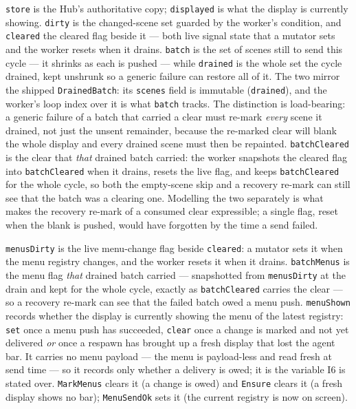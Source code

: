 \documentclass[a4paper,10pt,fleqn]{article}
\begin{document}
\texttt{store} is the Hub's authoritative copy; \texttt{displayed} is what
the display is currently showing.  \texttt{dirty} is the changed-scene set
guarded by the worker's condition, and \texttt{cleared} the cleared flag
beside it --- both live signal state that a mutator sets and the worker
resets when it drains.  \texttt{batch} is the set of scenes still to send this cycle --- it shrinks
as each is pushed --- while \texttt{drained} is the whole set the cycle
drained, kept unshrunk so a generic failure can restore all of it.  The two
mirror the shipped \texttt{DrainedBatch}: its \texttt{scenes} field is
immutable (\texttt{drained}), and the worker's loop index over it is what
\texttt{batch} tracks.  The distinction is load-bearing: a generic failure of
a batch that carried a clear must re-mark \emph{every} scene it drained, not
just the unsent remainder, because the re-marked clear will blank the whole
display and every drained scene must then be repainted.  \texttt{batchCleared}
is the clear that \emph{that} drained batch carried: the worker snapshots the
cleared flag into \texttt{batchCleared} when it drains, resets the live flag,
and keeps \texttt{batchCleared} for the whole cycle, so both the empty-scene
skip and a recovery re-mark can still see that the batch was a clearing one.
Modelling the two separately is what makes the recovery re-mark of a
consumed clear expressible; a single flag, reset when the blank is pushed,
would have forgotten by the time a send failed.

\texttt{menusDirty} is the live menu-change flag beside \texttt{cleared}: a
mutator sets it when the menu registry changes, and the worker resets it when
it drains.  \texttt{batchMenus} is the menu flag \emph{that} drained batch
carried --- snapshotted from \texttt{menusDirty} at the drain and kept for the
whole cycle, exactly as \texttt{batchCleared} carries the clear --- so a
recovery re-mark can see that the failed batch owed a menu push.
\texttt{menuShown} records whether the display is currently showing the menu
of the latest registry: \texttt{set} once a menu push has succeeded,
\texttt{clear} once a change is marked and not yet delivered \emph{or} once a
respawn has brought up a fresh display that lost the agent bar.  It carries no
menu payload --- the menu is payload-less and read fresh at send time --- so it
records only whether a delivery is owed; it is the variable I6 is stated over.
\texttt{MarkMenus} clears it (a change is owed) and \texttt{Ensure} clears it (a
fresh display shows no bar); \texttt{MenuSendOk} sets it (the current registry
is now on screen).
\end{document}
